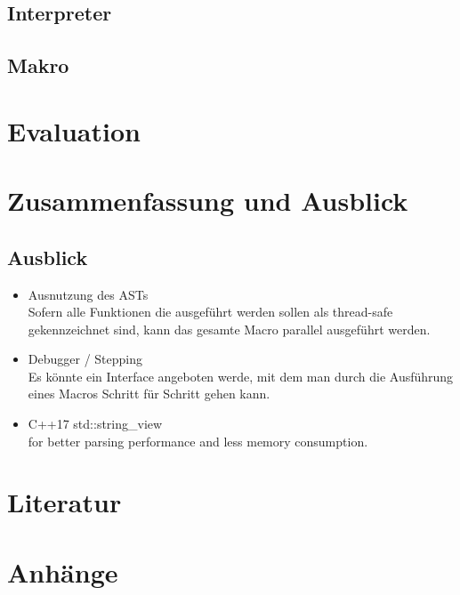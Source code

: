   \subsection{Interpreter}
  \label{ssec:Interpreter}

  \subsection{Makro}
  \label{ssec:Makro}

\section{Evaluation}
\label{sec:Evaluation}

\section{Zusammenfassung und Ausblick}
\label{sec:Zusammenfassung und Ausblick}

  \subsection{Ausblick}
  \label{sec:Ausblick}
    \begin{itemize}
      \item Ausnutzung des ASTs\\
        Sofern alle Funktionen die ausgeführt werden sollen als thread-safe gekennzeichnet sind, kann das gesamte Macro parallel ausgeführt werden.
      \item Debugger / Stepping\\
        Es könnte ein Interface angeboten werde, mit dem man durch die Ausführung eines Macros Schritt für Schritt gehen kann.
      \item C++17 std::string\_view\\
        for better parsing performance and less memory consumption.
    \end{itemize}


\section{Literatur}
\label{sec:Literatur}
  \nocite{*} %
  \printbibliography[heading=none]

\section{Anhänge}
\label{sec:Anhänge}


